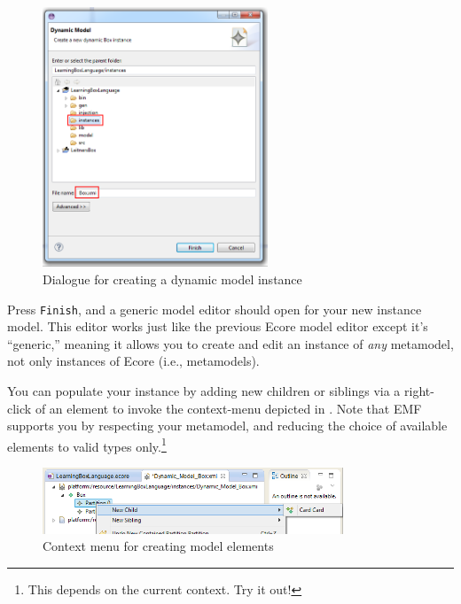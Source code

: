 \begin{stepbystep}
\vspace{0.5cm}

\begin{figure}[htbp]
	\centering
  \includegraphics[width=0.6\textwidth]{../../org.moflon.doc.handbook.02_leitnersLearningBox/3_creatingInstance/04_images/eclipse_nameDynamicInstance}
	\caption{Dialogue for creating a dynamic model instance}
	\label{eclipse:store_dynamic_instance}
\end{figure}

\item Press \texttt{Finish}, and a generic model editor should open for your new instance model. This editor works just like the
previous Ecore model editor except it's ``generic,'' meaning it allows you to create and edit an instance of \emph{any} metamodel, not only instances of Ecore
(i.e., metamodels).

\clearpage

\item You can populate your instance by adding new children or siblings via a right-click of an element to invoke the
context-menu depicted in . Note that EMF supports you by respecting your metamodel, and reducing the choice of available
elements to valid types only.\footnote{This depends on the current context. Try it out!}

\begin{figure}[htbp]
	\centering
  \includegraphics[width=0.8\textwidth]{../../org.moflon.doc.handbook.02_leitnersLearningBox/3_creatingInstance/04_images/adjustModel}
	\caption{Context menu for creating model elements}
	\label{eclipse:create_instance}
\end{figure}


\end{stepbystep}
